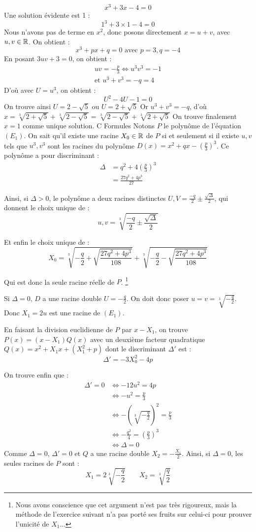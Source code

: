 \documentclass[]{../templates/homework}
\begin{document}
	$$ x^3 + 3x - 4 = 0$$
	\question Une solution évidente est 1 : $$1^3 + 3\times1 - 4 = 0$$
	\question Nous n'avons pas de terme en $x^2$, donc posons directement $x = u+v$, avec $u, v \in \mathbb R$.
	On obtient : $$x^3 + px + q = 0 \text{ avec } p=3, q=-4$$
	En posant $3uv + 3 = 0$, on obtient : 
\begin{align*}
 uv = -\frac{p}{3} \iff u^3v^3 = -1 \\
\text{et } u^3 + v^3 = -q = 4
\end{align*}
	D'où avec $U = u^3$, on obtient : $$U^2 -4U -1 =0$$
	On trouve ainsi $U = 2 - \sqrt{5}$ ou $U = 2 + \sqrt{5}$
	Or $u^3 + v^3 = -q$, d'où $x = \sqrt[3]{2+\sqrt{5}} + \sqrt[3]{2-\sqrt{5}} = \sqrt[3]{2-\sqrt{5}} + \sqrt[3]{2+\sqrt{5}}$
On trouve finalement $x=1$ comme unique solution.
	\partie C {Formules}
	 Notons $P$ le polynôme de l'équation $(E_1)$. On sait qu'il existe une racine $X_0 \in \mathbb R$ de $P$ si et seulement si il existe $u,v$ tels que $u^3,v^3$ sont les racines du polynôme $D(x) = x^2 + qx - \left(\frac p 3\right)^3$.
	Ce polynôme a pour discriminant :
	\begin{align*}
		\Delta &= q^2 + 4\left(\frac p 3\right)^3 \\
		&=  \frac {27q^2 + 4p^3}{27}
	\end{align*}
	
	
	Ainsi, si $\Delta > 0$, le polynôme a deux racines distinctes $U,V = \frac {-q}{2} \pm \frac {\sqrt \Delta} {2}$, qui donnent le choix unique de :
	$$u,v = \sqrt[3]{\frac {-q}{2} \pm \frac {\sqrt \Delta} {2}}$$
	
	Et enfin le choix unique de :
	$$X_0 = \sqrt[3]{-\frac {q}{2} + \sqrt {\frac {27q^2 + 4p^3}{108}} } + \sqrt[3]{-\frac {q}{2} - \sqrt {\frac {27q^2 + 4p^3}{108}} }$$
	
	Qui est donc la seule racine réelle de $P$. \footnote{Nous avons conscience que cet argument n'est pas très rigoureux, mais la méthode de l'exercice suivant n'a pas porté ses fruits sur celui-ci pour prouver l'unicité de $X_1$...}
	
	\subproblem Si $\Delta = 0$, $D$ a une racine double $U = -\frac q {2}$. On doit donc poser $u = v = \sqrt[3]{-\frac q 2}$. Donc $X_1 = 2u$ est une racine de $(E_1)$.
	
	
	En faisant la division euclidienne de $P$ par $x-X_1$, on trouve $P(x) = (x-X_1)Q(x)$ avec un deuxième facteur quadratique $Q(x) = x^2 + X_1x + (X_1^2 + p)$ dont le discriminant $\Delta'$ est :
	$$\Delta' = -3X_0^2 - 4p$$
	
	On trouve enfin que :
	\begin{align*}
		\Delta' = 0 &\iff -12u^2 = 4p \\
		&\iff -u^2 = \frac p 3\\
		&\iff -(\sqrt[3]{-\frac q 2})^2 = \frac p3\\
		&\iff -\frac {q^2} 4 = (\frac p 3)^3\\
		&\iff \Delta = 0
	\end{align*}
	Comme $\Delta = 0$, $\Delta' = 0$ et $Q$ a une racine double $X_2 = -\frac {X_1} 2$.
	Ainsi, si $\Delta = 0$, les seules racines de $P$ sont :
	\begin{equation*}
		X_1 = 2\sqrt[3]{-\frac q 2} \qquad X_2 = \sqrt[3]{\frac q 2}
	\end{equation*}
\end{document}
